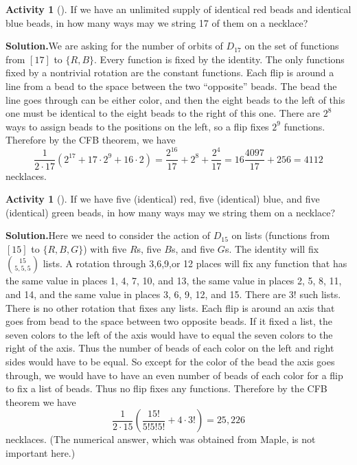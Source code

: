 \documentclass[10pt,]{book}
\theoremstyle{plain}
\theoremstyle{definition}
\newtheorem{activity}[project]{Activity}
\numberwithin{equation}{chapter}
\begin{document}
\begin{activity}[]\label{activity-297}
If we have an unlimited supply of identical red beads and identical blue beads, in how many ways may we string 17 of them on a necklace?%
\par\medskip\noindent%
\textbf{Solution.}\quad We are asking for the number of orbits of \(D_{17}\) on the set of functions from \([17]\) to \(\{R,B\}\). Every function is fixed by the identity. The only functions fixed by a nontrivial rotation are the constant functions. Each flip is around a line from a bead to the space between the two ``opposite'' beads. The bead the line goes through can be either color, and then the eight beads to the left of this one must be identical to the eight beads to the right of this one. There are \(2^8\) ways to assign beads to the positions on the left, so a flip fixes \(2^9\) functions. Therefore by the CFB theorem, we have%
\begin{equation*}
\frac{1}{2\cdot 17}\left(2^{17}+ 17\cdot2^9+16\cdot 2\right)=\frac{2^{16}}{17}+2^8 +\frac{2^4}{17}=16\frac{4097}{17}+256=4112
\end{equation*}
necklaces.%
\end{activity}
\begin{activity}[]\label{activity-298}
If we have five (identical) red, five (identical) blue, and five (identical) green beads, in how many ways may we string them on a necklace?%
\par\medskip\noindent%
\textbf{Solution.}\quad Here we need to consider the action of \(D_{15}\) on lists (functions from \([15]\) to \(\{R,B,G\}\)) with five \(R\)s, five \(B\)s, and five \(G\)s. The identity will fix \(\binom{15}{5,5,5}\) lists. A rotation through 3,6,9,or 12 places will fix any function that has the same value in places 1, 4, 7, 10, and 13, the same value in places 2, 5, 8, 11, and 14, and the same value in places 3, 6, 9, 12, and 15. There are \(3!\) such lists. There is no other rotation that fixes any lists. Each flip is around an axis that goes from bead to the space between two opposite beads. If it fixed a list, the seven colors to the left of the axis would have to equal the seven colors to the right of the axis. Thus the number of beads of each color on the left and right sides would have to be equal. So except for the color of the bead the axis goes through, we would have to have an even number of beads of each color for a flip to fix a list of beads. Thus no flip fixes any functions. Therefore by the CFB theorem we have%
\begin{equation*}
\frac{1}{2\cdot15}\left(\frac{15!}{5!5!5!} +4\cdot 3!\right)=25,226
\end{equation*}
necklaces. (The numerical answer, which was obtained from Maple, is not important here.)%
\end{activity}
\end{document}
